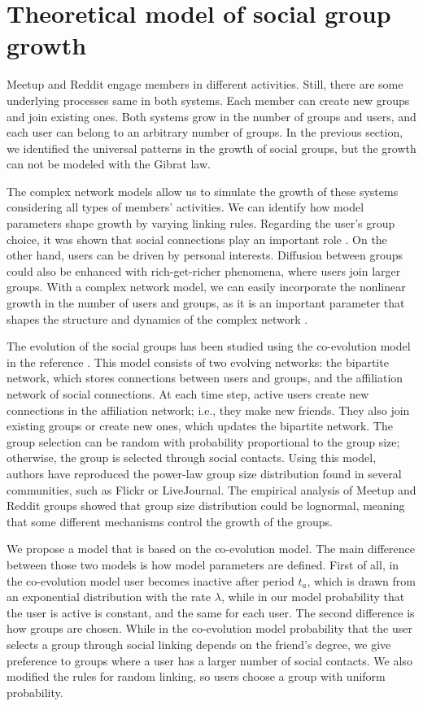 \clearpage
\newpage
\section{Theoretical model of social group growth}

Meetup and Reddit engage members in different activities. Still, there are some underlying processes same in both systems. Each member can create new groups and join existing ones. Both systems grow in the number of groups and users, and each user can belong to an arbitrary number of groups. In the previous section, we identified the universal patterns in the growth of social groups, but the growth can not be modeled with the Gibrat law. 

The complex network models allow us to simulate the growth of these systems considering all types of members' activities. We can identify how model parameters shape growth by varying linking rules.
Regarding the user's group choice, it was shown that social connections play an important role \cite{kairam2012life, zheleva2009co}. On the other hand, users can be driven by personal interests. Diffusion between groups could also be enhanced with rich-get-richer phenomena, where users join larger groups. With a complex network model, we can easily incorporate the nonlinear growth in the number of users and groups, as it is an important parameter that shapes the structure and dynamics of the complex network \cite{mitrovic2011quantitative, dankulov2015dynamics, vranic2021growth}.

The evolution of the social groups has been studied using the co-evolution model in the reference  \cite{zheleva2009co}. This model consists of two evolving networks: the bipartite network, which stores connections between users and groups, and the affiliation network of social connections. At each time step, active users create new connections in the affiliation network; i.e., they make new friends. They also join existing groups or create new ones, which updates the bipartite network. The group selection can be random with probability proportional to the group size; otherwise, the group is selected through social contacts. Using this model, authors have reproduced the power-law group size distribution found in several communities, such as Flickr or LiveJournal. The empirical analysis of Meetup and Reddit groups showed that group size distribution could be lognormal, meaning that some different mechanisms control the growth of the groups.

We propose a model that is based on the co-evolution model. The main difference between those two models is how model parameters are defined. First of all, in the co-evolution model user becomes inactive after period $t_a$, which is drawn from an exponential distribution with the rate $\lambda$, while in our model probability that the user is active is constant, and the same for each user. The second difference is how groups are chosen. While in the co-evolution model probability that the user selects a group through social linking depends on the friend's degree, we give preference to groups where a user has a larger number of social contacts. We also modified the rules for random linking, so users choose a group with uniform probability.


